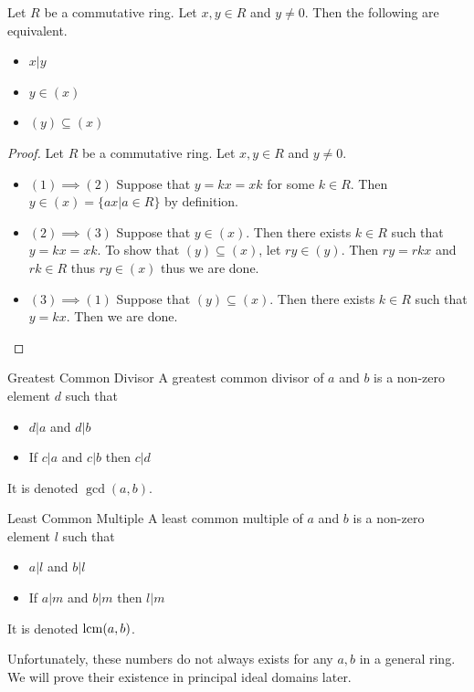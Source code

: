 \documentclass[a4paper]{article}
\begin{document}
\begin{prp}{}{} Let $R$ be a commutative ring. Let $x,y\in R$ and $y\neq 0$. Then the following are equivalent. 
\begin{itemize}
\item $x|y$
\item $y\in(x)$
\item $(y)\subseteq(x)$
\end{itemize}\tcbline
\begin{proof} Let $R$ be a commutative ring. Let $x,y\in R$ and $y\neq 0$. 
\begin{itemize}
\item $(1)\implies(2)$ Suppose that $y=kx=xk$ for some $k\in R$. Then $y\in(x)=\{ax|a\in R\}$ by definition. 
\item $(2)\implies(3)$ Suppose that $y\in(x)$. Then there exists $k\in R$ such that $y=kx=xk$. To show that $(y)\subseteq(x)$, let $ry\in(y)$. Then $ry=rkx$ and $rk\in R$ thus $ry\in(x)$ thus we are done. 
\item $(3)\implies(1)$ Suppose that $(y)\subseteq(x)$. Then there exists $k\in R$ such that $y=kx$. Then we are done. 
\end{itemize}
\end{proof}
\end{prp}

\begin{defn}{Greatest Common Divisor}{} A greatest common divisor of $a$ and $b$ is a non-zero element $d$ such that 
\begin{itemize}
\item $d|a$ and $d|b$
\item If $c|a$ and $c|b$ then $c|d$
\end{itemize} It is denoted $\gcd(a,b)$. 
\end{defn}

\begin{defn}{Least Common Multiple}{} A least common multiple of $a$ and $b$ is a non-zero element $l$ such that 
\begin{itemize}
\item $a|l$ and $b|l$
\item If $a|m$ and $b|m$ then $l|m$
\end{itemize} It is denoted $\operatorname{lcm}(a,b)$. 
\end{defn}

Unfortunately, these numbers do not always exists for any $a,b$ in a general ring. We will prove their existence in principal ideal domains later. 
\end{document}
